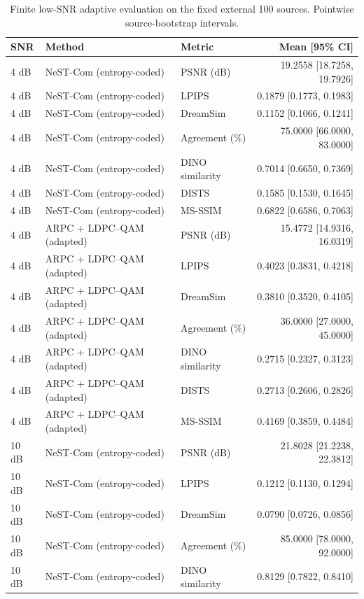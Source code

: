 \begin{table}[t]
\centering\small
\caption{Finite low-SNR adaptive evaluation on the fixed external 100 sources. Pointwise source-bootstrap intervals.}
\begin{tabular}{lllr}
\toprule
SNR & Method & Metric & Mean [95\% CI] \\
\midrule
4 dB & NeST-Com (entropy-coded) & PSNR (dB) & 19.2558 [18.7258, 19.7926] \\
4 dB & NeST-Com (entropy-coded) & LPIPS & 0.1879 [0.1773, 0.1983] \\
4 dB & NeST-Com (entropy-coded) & DreamSim & 0.1152 [0.1066, 0.1241] \\
4 dB & NeST-Com (entropy-coded) & Agreement (\%) & 75.0000 [66.0000, 83.0000] \\
4 dB & NeST-Com (entropy-coded) & DINO similarity & 0.7014 [0.6650, 0.7369] \\
4 dB & NeST-Com (entropy-coded) & DISTS & 0.1585 [0.1530, 0.1645] \\
4 dB & NeST-Com (entropy-coded) & MS-SSIM & 0.6822 [0.6586, 0.7063] \\
4 dB & ARPC + LDPC--QAM (adapted) & PSNR (dB) & 15.4772 [14.9316, 16.0319] \\
4 dB & ARPC + LDPC--QAM (adapted) & LPIPS & 0.4023 [0.3831, 0.4218] \\
4 dB & ARPC + LDPC--QAM (adapted) & DreamSim & 0.3810 [0.3520, 0.4105] \\
4 dB & ARPC + LDPC--QAM (adapted) & Agreement (\%) & 36.0000 [27.0000, 45.0000] \\
4 dB & ARPC + LDPC--QAM (adapted) & DINO similarity & 0.2715 [0.2327, 0.3123] \\
4 dB & ARPC + LDPC--QAM (adapted) & DISTS & 0.2713 [0.2606, 0.2826] \\
4 dB & ARPC + LDPC--QAM (adapted) & MS-SSIM & 0.4169 [0.3859, 0.4484] \\
10 dB & NeST-Com (entropy-coded) & PSNR (dB) & 21.8028 [21.2238, 22.3812] \\
10 dB & NeST-Com (entropy-coded) & LPIPS & 0.1212 [0.1130, 0.1294] \\
10 dB & NeST-Com (entropy-coded) & DreamSim & 0.0790 [0.0726, 0.0856] \\
10 dB & NeST-Com (entropy-coded) & Agreement (\%) & 85.0000 [78.0000, 92.0000] \\
10 dB & NeST-Com (entropy-coded) & DINO similarity & 0.8129 [0.7822, 0.8410] \\

\end{tabular}
\end{table}
